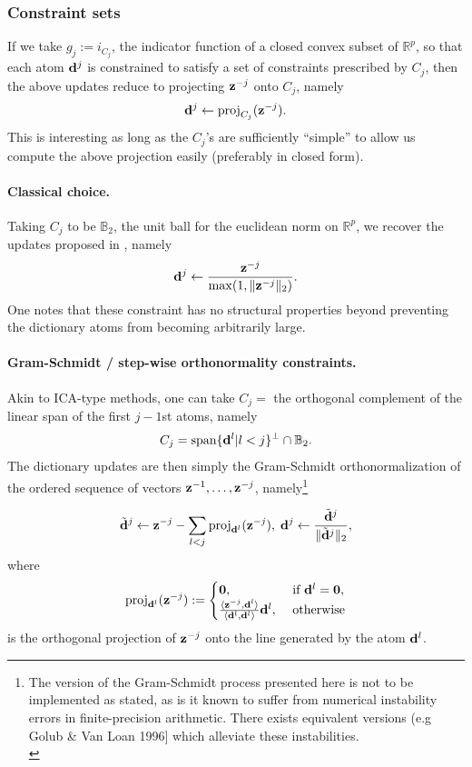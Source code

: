 \subsubsection{Constraint sets}
If we take $g_j := i_{C_j}$, the indicator function of a closed convex subset of $\mathbb R^p$, so that each atom $\mathbf{d}^j$ is constrained to satisfy a set of constraints prescribed by $C_j$, then the above updates reduce to projecting $\mathbf{z}^{-j}$ onto $C_j$, namely
\begin{equation}
\mathbf{d}^j \leftarrow  \text{proj}_{C_j}(\mathbf{z}^{-j}).
\end{equation}
This is interesting as long as the $C_j$'s are sufficiently ``simple'' to allow us compute the above projection easily (preferably in closed form).
\paragraph{Classical choice.}

Taking $C_j$ to be $\mathbb B_2$, the unit ball for the euclidean norm on  $\mathbb R^p$, we recover the updates proposed in \citep{mairal2009,mairal2010}, namely
\begin{equation}
\mathbf{d}^j \leftarrow  \frac{\mathbf{z}^{-j}}{\max(1,\|\mathbf{z}^{-j}\|_2)}.
\end{equation}
One notes that these constraint has no structural properties beyond preventing the dictionary atoms from becoming arbitrarily large.

\paragraph{Gram-Schmidt / step-wise orthonormality constraints.}
Akin to ICA-type methods, one can take $C_j =$ the orthogonal complement of the linear span of the first $j-1$st atoms, namely
  \begin{equation}
    C_{j} = \text{span}\{\mathbf{d}^l | l < j\}^\perp \cap \mathbb B_{2}.
  \end{equation}
  The dictionary updates are then simply the Gram-Schmidt orthonormalization of the ordered sequence of vectors $\mathbf{z}^{-1},\ldots,\mathbf{z}^{-j}$, namely\footnote{The version of the Gram-Schmidt process presented here is not to be implemented as stated, as is it known to suffer from numerical instability errors in finite-precision arithmetic. There exists equivalent versions (e.g Golub \& Van Loan 1996] which alleviate these instabilities.\\}

  \begin{eqnarray}
    \tilde{\mathbf{d}}^j \leftarrow \mathbf{z}^{-j} -\sum_{l < j}\operatorname{proj}_{\mathbf{d}^l}(\mathbf{z}^{-j}),\;\mathbf{d}^j \leftarrow \frac{\tilde{\mathbf{d}}^j}{\|\tilde{\mathbf{d}}^j\|_2},
  \end{eqnarray}
  where
  $$
  \operatorname{proj}_{\mathbf{d}^l}(\mathbf{z}^{-j}) := \begin{cases}\textbf{0},&\mbox{ if }\mathbf{d}^l = \textbf{0},\\
    \frac{\langle \mathbf{z}^{-j},\mathbf{d}^l\rangle}{\langle \mathbf{d}^l,\mathbf{d}^l\rangle}\mathbf{d}^l,&\mbox{ otherwise}
  \end{cases}
  $$
  is the orthogonal projection of $\mathbf{z}^{-j}$ onto the line generated by the atom  $\mathbf{d}^l$.
  

